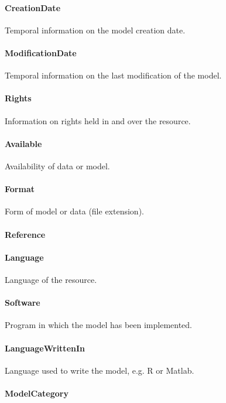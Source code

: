 \documentclass[a4paper]{report}
\begin{document}
\paragraph{CreationDate}
Temporal information on the model creation date.

\paragraph{ModificationDate}
Temporal information on the last modification of the model.

\paragraph{Rights}
Information on rights held in and over the resource.

\paragraph{Available}
Availability of data or model.

\paragraph{Format}
Form of model or data (file extension).

\paragraph{Reference}

\paragraph{Language}
Language of the resource.

\paragraph{Software}
Program in which the model has been implemented.

\paragraph{LanguageWrittenIn}
Language used to write the model, e.g. R or Matlab.

\paragraph{ModelCategory}
\end{document}
